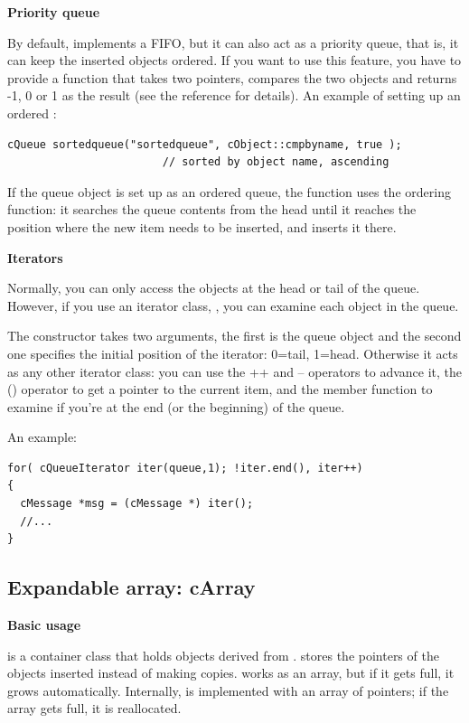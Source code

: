 \textbf{Priority queue}


By default,  implements a FIFO, but it can also act as
a priority queue, that is, it can keep the inserted objects
ordered.  If you want to use this feature, you have
to provide a function that takes two  pointers,
compares the two objects and returns -1, 0 or 1 as the result (see the
reference for details).  An example of setting up an ordered
:

\begin{verbatim}
cQueue sortedqueue("sortedqueue", cObject::cmpbyname, true );
                        // sorted by object name, ascending
\end{verbatim}


If the queue object is set up as an ordered queue, the 
function uses the ordering function: it searches the queue contents
from the head until it reaches the position where the new item
needs to be inserted, and inserts it there.


\textbf{Iterators}


Normally, you can only access the objects at the head or tail of the
queue. However, if you use an iterator class, ,
you can examine each object in the queue.

The  constructor takes two arguments, the first
is the queue object and the second one specifies the initial position
of the iterator: 0=tail, 1=head. Otherwise it acts as any other
{\opp} iterator class: you can use the ++ and -- operators to advance
it, the () operator to get a pointer to the current item, and the
 member function to examine if you're at the end (or the
beginning) of the queue.


An example:

\begin{verbatim}
for( cQueueIterator iter(queue,1); !iter.end(), iter++)
{
  cMessage *msg = (cMessage *) iter();
  //...
}
\end{verbatim}




\subsection{Expandable array: cArray}

\textbf{Basic usage}


 is a container class that holds objects derived from
.  stores the pointers of the objects
inserted instead of making copies.  works as an array,
but if it gets full, it grows automatically. Internally,
 is implemented with an array of pointers; if the array
gets full, it is reallocated.

